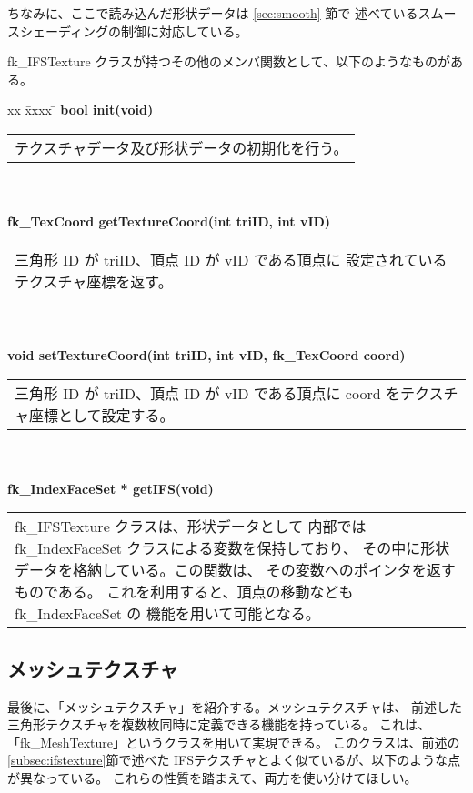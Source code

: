 ちなみに、ここで読み込んだ形状データは \ref{sec:smooth} 節で
述べているスムースシェーディングの制御に対応している。

fk\_IFSTexture クラスが持つその他のメンバ関数として、以下のようなものがある。
\begin{tabbing}
xx \= xxxx \= \kill
\> \textbf{bool init(void)} \\
	\> \> \begin{tabular}{p{15cm}}
		テクスチャデータ及び形状データの初期化を行う。
	\end{tabular} \\ \\

\> \textbf{fk\_TexCoord getTextureCoord(int triID, int vID)} \\
	\> \> \begin{tabular}{p{15cm}}
		三角形 ID が triID、頂点 ID が vID である頂点に
		設定されているテクスチャ座標を返す。
	\end{tabular} \\ \\

\> \textbf{void setTextureCoord(int triID, int vID, fk\_TexCoord coord)} \\
	\> \> \begin{tabular}{p{15cm}}
		三角形 ID が triID、頂点 ID が vID である頂点に
		coord をテクスチャ座標として設定する。
	\end{tabular} \\ \\

\> \textbf{fk\_IndexFaceSet * getIFS(void)} \\
	\> \> \begin{tabular}{p{15cm}}
		fk\_IFSTexture クラスは、形状データとして
		内部では fk\_IndexFaceSet クラスによる変数を保持しており、
		その中に形状データを格納している。この関数は、
		その変数へのポインタを返すものである。
		これを利用すると、頂点の移動なども fk\_IndexFaceSet の
		機能を用いて可能となる。
	\end{tabular}
\end{tabbing}

\subsection{メッシュテクスチャ}
最後に、「メッシュテクスチャ」を紹介する。メッシュテクスチャは、
前述した三角形テクスチャを複数枚同時に定義できる機能を持っている。
これは、「fk\_MeshTexture」というクラスを用いて実現できる。
このクラスは、前述の \ref{subsec:ifstexture}節で述べた
IFSテクスチャとよく似ているが、以下のような点が異なっている。
これらの性質を踏まえて、両方を使い分けてほしい。

